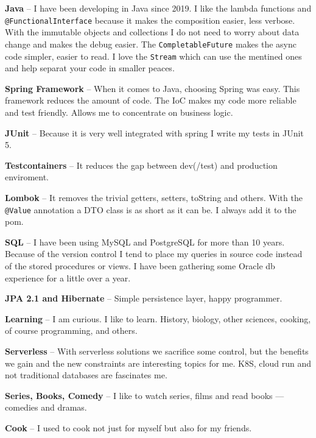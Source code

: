 \documentclass[9pt]{developercv} %
\begin{document}
\begin{minipage}[t]{0.49\textwidth}
    \vspace{-\baselineskip} %


    \textbf{Java} -- I have been developing in Java since 2019.
        I like the lambda functions and \texttt{@FunctionalInterface} because it makes the composition easier, less verbose.
        With the immutable objects and collections I do not need to worry about data change and makes the debug easier.
        The \texttt{CompletableFuture} makes the async code simpler, easier to read.
        I love the \texttt{Stream} which can use the mentined ones and help separat your code in smaller peaces.

    \textbf{Spring Framework} -- When it comes to Java, choosing Spring was easy.
    This framework reduces the amount of code. 
    The IoC makes my code more reliable and test friendly. Allows me to concentrate on business logic.
    

    \textbf{JUnit} -- Because it is very well integrated with spring I write my tests in JUnit 5.

    \textbf{Testcontainers} -- It reduces the gap between dev(/test) and production enviroment.

    \textbf{Lombok} -- It removes the trivial getters, setters, toString and others. With the \texttt{@Value} annotation a DTO class is as short as it can be. I always add it to the pom.

    \textbf{SQL} -- I have been using MySQL and PostgreSQL for more than 10 years.
    Because of the version control I tend to place my queries in source code instead of the stored procedures or views. I have been gathering some Oracle db experience for a little over a year.

    \textbf{JPA 2.1 and Hibernate} -- Simple persistence layer, happy programmer.

\end{minipage}


\textbf{Learning} -- I am curious. I like to learn. History, biology, other sciences, cooking, of course programming, and others.

\textbf{Serverless} -- With serverless solutions we sacrifice some control, but the benefits we gain and the new constraints are interesting topics for me. K8S, cloud run and not traditional databases are fascinates me.

\textbf{Series, Books, Comedy} -- I like to watch series, films and read books — comedies and dramas.

\textbf{Cook} -- I used to cook not just for myself but also for my friends.
\end{document}

